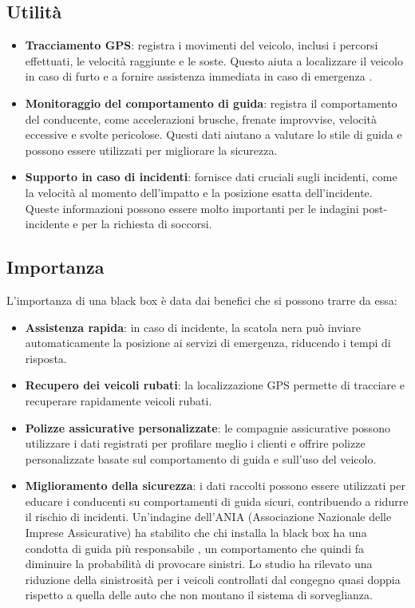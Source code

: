 \documentclass[12pt, a4paper, italian]{report}
\numberwithin{figure}{chapter}
\numberwithin{table}{chapter}
\begin{document}
\subsection{Utilità}
\begin{itemize}
    \item \textbf{Tracciamento GPS}: registra i movimenti del veicolo, inclusi i percorsi effettuati, le velocità raggiunte e le soste. Questo aiuta a localizzare il veicolo in caso di furto e a fornire assistenza immediata in caso di emergenza \cite{khin2018real}.
    \item \textbf{Monitoraggio del comportamento di guida}: registra il comportamento del conducente, come accelerazioni brusche, frenate improvvise, velocità eccessive e svolte pericolose. Questi dati aiutano a valutare lo stile di guida e possono essere utilizzati per migliorare la sicurezza. \cite{hermawan2020acquisition}
    \item \textbf{Supporto in caso di incidenti}: fornisce dati cruciali sugli incidenti, come la velocità al momento dell'impatto e la posizione esatta dell'incidente. Queste informazioni possono essere molto importanti per le indagini post-incidente e per la richiesta di soccorsi. \cite{thompson2010using}
\end{itemize}
\subsection{Importanza}
L'importanza di una black box è data dai benefici che si possono trarre da essa: 
\begin{itemize}
    \item \textbf{Assistenza rapida}: in caso di incidente, la scatola nera può inviare automaticamente la posizione ai servizi di emergenza, riducendo i tempi di risposta.
    \item \textbf{Recupero dei veicoli rubati}: la localizzazione GPS permette di tracciare e recuperare rapidamente veicoli rubati.
    \item \textbf{Polizze assicurative personalizzate}: le compagnie assicurative possono utilizzare i dati registrati per profilare meglio i clienti e offrire polizze personalizzate basate sul comportamento di guida e sull'uso del veicolo.
    \item \textbf{Miglioramento della sicurezza}: i dati raccolti possono essere utilizzati per educare i conducenti su comportamenti di guida sicuri, contribuendo a ridurre il rischio di incidenti. Un’indagine dell’ANIA (Associazione Nazionale delle Imprese Assicurative) ha stabilito che chi installa la black box ha una condotta di guida più responsabile \cite{diminuzioneIncidenti}, un comportamento che quindi fa diminuire la probabilità di provocare sinistri. Lo studio ha rilevato una riduzione della sinistrosità per i veicoli controllati dal congegno quasi doppia rispetto a quella delle auto che non montano il sistema di sorveglianza. 
\end{itemize}
\end{document}
